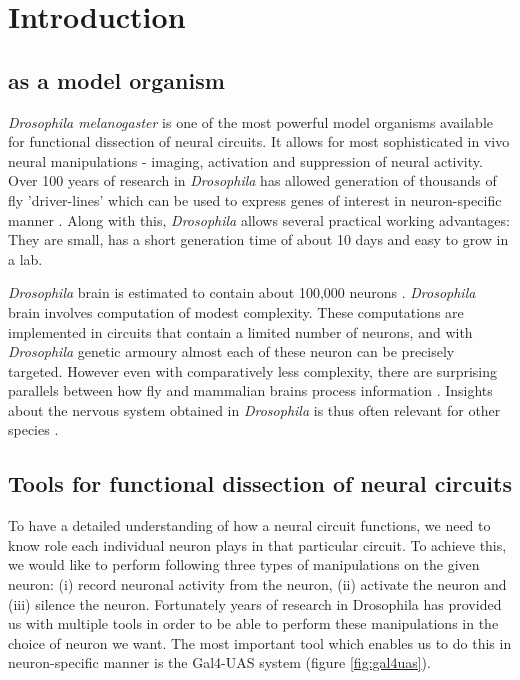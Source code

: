 \chapter{Introduction}
\label{chp:Introduction}


\section{\protect{} as a model organism}
\textit{Drosophila melanogaster} is one of the most powerful model organisms available for functional dissection of neural circuits. It allows for most sophisticated in vivo neural manipulations - imaging, activation and suppression of neural activity. Over 100 years of research in \textit{Drosophila} has allowed generation of thousands of fly 'driver-lines' which can be used to express genes of interest in neuron-specific manner \parencite{Pfeiffer2008}. Along with this, \textit{Drosophila} allows several practical working advantages: They are small, has a short generation time of about 10 days and easy to grow in a lab. 

\textit{Drosophila} brain is estimated to contain about 100,000 neurons \parencite{Zheng2018}. \textit{Drosophila} brain involves computation of modest complexity. These computations are implemented in circuits that contain a limited number of neurons, and with \textit{Drosophila} genetic armoury almost each of these neuron can be precisely targeted. However even with comparatively less complexity, there are surprising parallels between how fly and mammalian brains process information \parencite{Borst2015}. Insights about the nervous system obtained in \textit{Drosophila} is thus often relevant for other species \parencite{Bellen2010, Venken2011}.

\section{Tools for functional dissection of \protect{} neural circuits}
To have a detailed understanding of how a neural circuit functions, we need to know role each individual neuron plays in that particular circuit. To achieve this, we would like to perform following three types of manipulations on the given neuron: (i) record neuronal activity from the neuron, (ii) activate the neuron and (iii) silence the neuron. Fortunately years of research in Drosophila has provided us with multiple tools in order to be able to perform these manipulations in the choice of neuron we want. The most important tool which enables us to do this in neuron-specific manner is the Gal4-UAS system (figure  \ref{fig:gal4uas}). 

